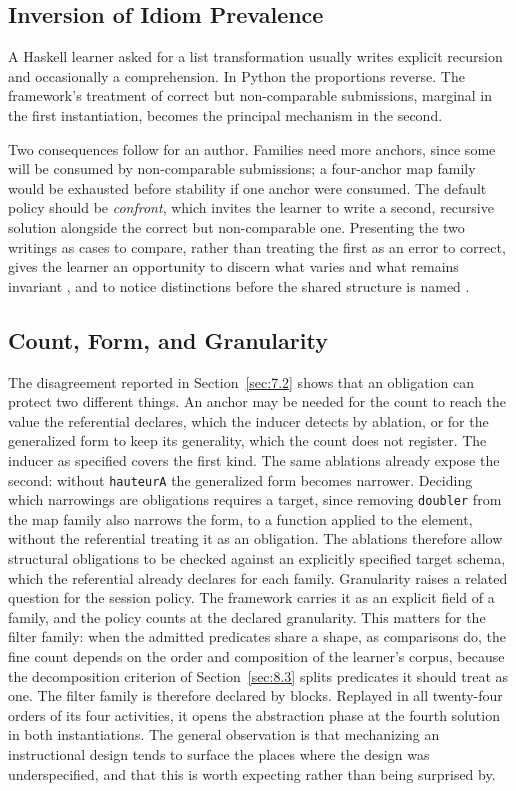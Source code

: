 \documentclass[journal]{IEEEtran}
\begin{document}
\subsection{Inversion of Idiom Prevalence}\label{sec:9.2}
A Haskell learner asked for a list transformation usually writes
explicit recursion and occasionally a comprehension. In Python the
proportions reverse. The framework's treatment of correct but
non-comparable submissions, marginal in the first instantiation, becomes
the principal mechanism in the second.

Two consequences follow for an author. Families need more anchors, since
some will be consumed by non-comparable submissions; a four-anchor
map family would be exhausted before stability if one anchor were
consumed. The default policy should be \emph{confront}, which invites the learner to write a second, recursive solution alongside the correct but non-comparable one. Presenting the two writings as cases to compare,
rather than treating the first as an error to correct, gives the learner
an opportunity to discern what varies and what remains invariant
\cite{b20}, and to notice distinctions before the shared structure is named
\cite{b21}.

\subsection{Count, Form, and Granularity}\label{sec:9.3}
The disagreement reported in Section~\ref{sec:7.2} shows that an obligation can
protect two different things. An anchor may be needed for the count to
reach the value the referential declares, which the inducer detects by
ablation, or for the generalized form to keep its generality, which the
count does not register. The inducer as specified covers the first kind.
The same ablations already expose the second: without \texttt{hauteurA}
the generalized form becomes narrower. Deciding which narrowings are
obligations requires a target, since removing \texttt{doubler} from the
map family also narrows the form, to a function applied to the element,
without the referential treating it as an obligation. The ablations
therefore allow structural obligations to be checked against an
explicitly specified target schema, which the referential already
declares for each family. Granularity raises a related
question for the session policy. The framework carries it as an explicit
field of a family, and the policy counts at the declared granularity.
This matters for the filter
family: when the admitted predicates share a shape, as comparisons do, the
fine count depends on the order and composition of the learner's corpus,
because the decomposition criterion of Section~\ref{sec:8.3} splits predicates it
should treat as one. The filter family is therefore declared by blocks.
Replayed in all twenty-four orders of its four activities, it opens the
abstraction phase at the fourth solution in both instantiations. The general
observation is that mechanizing an instructional design tends to surface
the places where the design was underspecified, and that this is worth
expecting rather than being surprised by.
\end{document}
